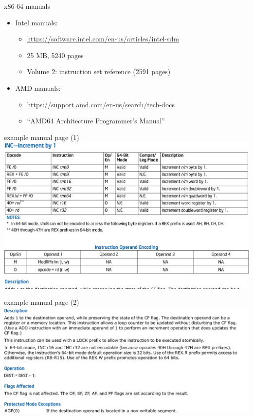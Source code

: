 \begin{frame}{x86-64 manuals}
\begin{itemize}
\item Intel manuals:
    \begin{itemize}
    \item \small \url{https://software.intel.com/en-us/articles/intel-sdm}
    \item 25 MB, 5240 pages
    \item Volume 2: instruction set reference (2591 pages)
    \end{itemize}
\item AMD manuals:
    \begin{itemize}
    \item \small \url{https://support.amd.com/en-us/search/tech-docs}
    \item ``AMD64 Architecture Programmer's Manual''
    \end{itemize}
\end{itemize}
\end{frame}

\begin{frame}{example manual page (1)}
\includegraphics[width=\textwidth]{../asm/example-manual}
\end{frame}

\begin{frame}{example manual page (2)}
\includegraphics[width=\textwidth]{../asm/example-manual2}
\end{frame}

